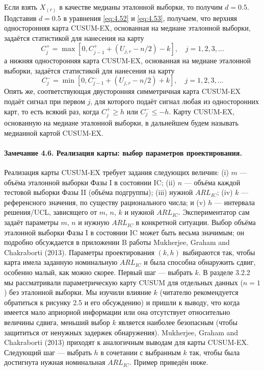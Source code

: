 Если взять \(X_{(r)}\) в качестве медианы эталонной выборки, то получим \(d = 0.5\). Подставив \(d = 0.5\) в уравнения \eqref{eq:4.52} и \eqref{eq:4.53}, получаем, что верхняя односторонняя карта CUSUM-EX, основанная на медиане эталонной выборки, задаётся статистикой для нанесения на карту
\begin{equation}
	C_j^+ = \max\left[ 0, C_{j-1}^+ + \left( U_{j,r} - n/2 \right) - k \right], \quad j = 1, 2, 3, \ldots
	\label{eq:4.54}
\end{equation}
а нижняя односторонняя карта CUSUM-EX, основанная на медиане эталонной выборки, задаётся статистикой для нанесения на карту
\begin{equation}
	C_j^- = \min\left[ 0, C_{j-1}^- + \left( U_{j,r} - n/2 \right) + k \right], \quad j = 1, 2, 3, \ldots
	\label{eq:4.55}
\end{equation}
Опять же, соответствующая двусторонняя симметричная карта CUSUM-EX подаёт сигнал при первом \(j\), для которого подаёт сигнал любая из односторонних карт, то есть всякий раз, когда \(C_j^+ \ge h\) или \(C_j^- \le -h\). Карту CUSUM-EX, основанную на медиане эталонной выборки, в дальнейшем будем называть медианной картой CUSUM-EX.

\paragraph{Замечание 4.6. Реализация карты: выбор параметров проектирования.} Реализация карты CUSUM-EX требует задания следующих величин: (i) \(m\) --- объёма эталонной выборки Фазы I в состоянии IC; (ii) \(n\) --- объёма каждой тестовой выборки Фазы II (объёма подгруппы); (iii) нужной \(ARL_{IC}\); (iv) \(k\) --- референсного значения, по существу рационального числа; и (v) \(h\) --- интервала решения/UCL, зависящего от \(m\), \(n\), \(k\) и нужной \(ARL_{IC}\). Экспериментатор сам задаёт параметры \(m\), \(n\) и нужную \(ARL_{IC}\) в конкретной ситуации. Выбор объёма эталонной выборки Фазы I в состоянии IC может быть весьма значимым; он подробно обсуждается в приложении B работы Mukherjee, Graham and Chakraborti (2013). Параметры проектирования \((k, h)\) выбираются так, чтобы карта имела заданную номинальную \(ARL_{IC}\) и была способна обнаружить сдвиг, особенно малый, как можно скорее. Первый шаг --- выбрать \(k\). В разделе 3.2.2 мы рассматривали параметрическую карту CUSUM для отдельных данных (\(n = 1\)) без эталонной выборки. Мы изучили влияние \(k\) (читателю рекомендуется обратиться к рисунку 2.5 и его обсуждению) и пришли к выводу, что когда имеется мало априорной информации или она отсутствует относительно величины сдвига, меньший выбор \(k\) является наиболее безопасным (чтобы защититься от ненужных задержек обнаружения). Mukherjee, Graham and Chakraborti (2013) приходят к аналогичным выводам для карты CUSUM-EX. Следующий шаг --- выбрать \(h\) в сочетании с выбранным \(k\) так, чтобы была достигнута нужная номинальная \(ARL_{IC}\). Пример приведён ниже.

